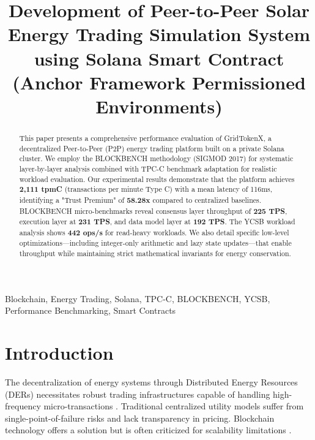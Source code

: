 \documentclass[conference]{IEEEtran}
\begin{document}
\title{Development of Peer-to-Peer Solar Energy Trading Simulation System using Solana Smart Contract\\
\large (Anchor Framework Permissioned Environments)}

\author{
}

\maketitle

\begin{abstract}
This paper presents a comprehensive performance evaluation of GridTokenX, a decentralized Peer-to-Peer (P2P) energy trading platform built on a private Solana cluster. We employ the BLOCKBENCH methodology (SIGMOD 2017) for systematic layer-by-layer analysis combined with TPC-C benchmark adaptation for realistic workload evaluation. Our experimental results demonstrate that the platform achieves \textbf{2,111 tpmC} (transactions per minute Type C) with a mean latency of 116ms, identifying a "Trust Premium" of \textbf{58.28x} compared to centralized baselines. BLOCKBENCH micro-benchmarks reveal consensus layer throughput of \textbf{225 TPS}, execution layer at \textbf{231 TPS}, and data model layer at \textbf{192 TPS}. The YCSB workload analysis shows \textbf{442 ops/s} for read-heavy workloads. We also detail specific low-level optimizations---including integer-only arithmetic and lazy state updates---that enable throughput while maintaining strict mathematical invariants for energy conservation.
\end{abstract}

\begin{IEEEkeywords}
Blockchain, Energy Trading, Solana, TPC-C, BLOCKBENCH, YCSB, Performance Benchmarking, Smart Contracts
\end{IEEEkeywords}

\section{Introduction}
The decentralization of energy systems through Distributed Energy Resources (DERs) necessitates robust trading infrastructures capable of handling high-frequency micro-transactions \cite{b2}. Traditional centralized utility models suffer from single-point-of-failure risks and lack transparency in pricing. Blockchain technology offers a solution but is often criticized for scalability limitations \cite{b4}.
\end{document}
